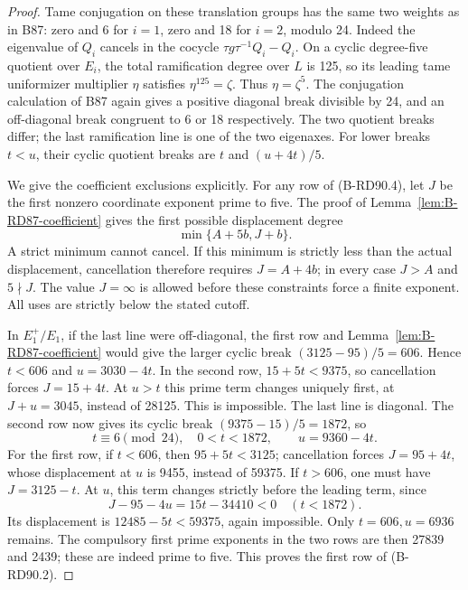 \begin{proof}
Tame conjugation on these translation groups has the same two weights
as in B87: zero and 6 for \(i=1\), zero and 18 for \(i=2\), modulo
24. Indeed the eigenvalue of \(Q_i\) cancels in the cocycle
\(\tau g\tau^{-1}Q_i-Q_i\). On a cyclic degree-five quotient over
\(E_i\), the total ramification degree over \(L\) is 125, so its
leading tame uniformizer multiplier \(\eta\) satisfies
\(\eta^{125}=\zeta\). Thus \(\eta=\zeta^5\). The conjugation
calculation of B87 again gives a positive diagonal break divisible
by 24, and an off-diagonal break congruent to 6 or 18 respectively.
The two quotient breaks differ; the last ramification line is one
of the two eigenaxes. For lower breaks \(t<u\), their cyclic quotient
breaks are \(t\) and \((u+4t)/5\).

We give the coefficient exclusions explicitly. For any row of
(B-RD90.4), let \(J\) be the first nonzero coordinate exponent prime
to five. The proof of Lemma~\ref{lem:B-RD87-coefficient} gives the
first possible displacement degree
\[
                  \min\{A+5b,J+b\}.                 \tag{B-RD90.5}
\]
A strict minimum cannot cancel. If this minimum is strictly less
than the actual displacement, cancellation therefore requires
\(J=A+4b\); in every case \(J>A\) and \(5\nmid J\).
The value \(J=\infty\) is allowed before these constraints force
a finite exponent. All uses are strictly below the stated cutoff.

In \(E_1^+/E_1\), if the last line were off-diagonal, the first
row and Lemma~\ref{lem:B-RD87-coefficient} would give the larger
cyclic break \((3125-95)/5=606\). Hence \(t<606\) and
\(u=3030-4t\). In the second row,
\(15+5t<9375\), so cancellation forces \(J=15+4t\).
At \(u>t\) this prime term changes uniquely first, at
\(J+u=3045\), instead of 28125. This is impossible.
The last line is diagonal. The second row now gives its cyclic
break \((9375-15)/5=1872\), so
\[
             t\equiv6\pmod{24},\quad 0<t<1872,
             \qquad u=9360-4t.                      \tag{B-RD90.6}
\]
For the first row, if \(t<606\), then \(95+5t<3125\);
cancellation forces \(J=95+4t\), whose displacement at \(u\)
is 9455, instead of 59375. If \(t>606\), one must have
\(J=3125-t\). At \(u\), this term changes strictly before the
leading term, since
\[
 J-95-4u=15t-34410<0 \quad(t<1872).
\]
Its displacement is \(12485-5t<59375\), again impossible.
Only \(t=606,u=6936\) remains. The compulsory first prime
exponents in the two rows are then 27839 and 2439; these are
indeed prime to five. This proves the first row of (B-RD90.2).


\end{proof}
